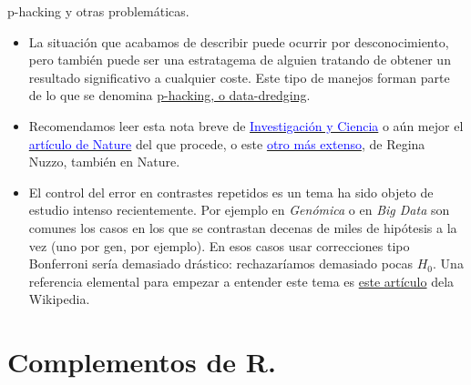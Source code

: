 \documentclass[
  9pt,
  ignorenonframetext,
]{beamer}
\newcommand{\link}[2]{\textcolor{blue}{{\href{#1}{#2}}}}
\begin{document}
\begin{frame}{p-hacking y otras problemáticas.}
\protect\hypertarget{p-hacking-y-otras-problematicas.}{}

\begin{itemize}
\item
  La situación que acabamos de describir puede ocurrir por
  desconocimiento, pero también puede ser una estratagema de alguien
  tratando de obtener un resultado significativo a cualquier coste. Este
  tipo de manejos forman parte de lo que se denomina
  \link{https://en.wikipedia.org/wiki/Data_dredging}{p-hacking, o data-dredging}.
\item
  Recomendamos leer esta nota breve de
  \href{http://www.investigacionyciencia.es/noticias/grandes-expertos-en-el-uso-de-la-estadstica-proclaman-que-0-05-no-es-el-filtro-adecuado-15521?utm_source=boletin\&utm_medium=email\&utm_campaign=Del+1+al+8+de+septiembre}{\textcolor{blue}{Investigación y Ciencia}}
  o aún mejor el
  \href{https://www.nature.com/news/big-names-in-statistics-want-to-shake-up-much-maligned-p-value-1.22375}{\textcolor{blue}{artículo de Nature}}
  del que procede, o este
  \href{http://www.nature.com/news/scientific-method-statistical-errors-1.14700}{\textcolor{blue}{otro más extenso}},
  de Regina Nuzzo, también en Nature.
\item
  El control del error en contrastes repetidos es un tema ha sido objeto
  de estudio intenso recientemente. Por ejemplo en \emph{Genómica} o en
  \emph{Big Data} son comunes los casos en los que se contrastan decenas
  de miles de hipótesis a la vez (uno por gen, por ejemplo). En esos
  casos usar correcciones tipo Bonferroni sería demasiado drástico:
  rechazaríamos demasiado pocas \(H_0\). Una referencia elemental para
  empezar a entender este tema es
  \link{https://en.wikipedia.org/wiki/Family-wise_error_rate}{este artículo}
  dela Wikipedia.
\end{itemize}

\end{frame}

\hypertarget{complementos-de-r.}{%
\section{Complementos de R.}\label{complementos-de-r.}}
\end{document}
